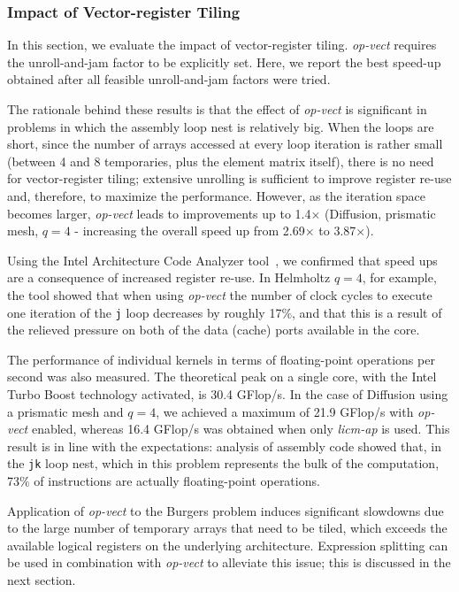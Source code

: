 \subsubsection{Impact of Vector-register Tiling}
\label{sec:perf-eval-opvect}

In this section, we evaluate the impact of vector-register tiling. \emph{op-vect} requires the unroll-and-jam factor to be explicitly set. Here, we report the best speed-up obtained after all feasible unroll-and-jam factors were tried. 

The rationale behind these results is that the effect of \emph{op-vect} is significant in problems in which the assembly loop nest is relatively big. When the loops are short, since the number of arrays accessed at every loop iteration is rather small (between 4 and 8 temporaries, plus the element matrix itself), there is no need for
vector-register tiling; extensive unrolling is sufficient to improve register re-use and, therefore, to maximize the performance. However, as the iteration space becomes larger, \emph{op-vect} leads to improvements up to 1.4$\times$ (Diffusion, prismatic mesh, $q=4$ - increasing the overall speed up from 2.69$\times$ to 3.87$\times$).

Using the Intel Architecture Code Analyzer tool~\cite{IACA}, we confirmed that speed ups are a consequence of increased register re-use. In Helmholtz $q=4$, for example, the tool showed that when using \emph{op-vect} the number of clock cycles to execute one iteration of the \texttt{j} loop decreases by roughly 17$\%$, and that this is a result of the relieved pressure on both of the data (cache) ports available in the core.

The performance of individual kernels in terms of floating-point operations per second was also measured. The theoretical peak on a single core, with the Intel Turbo Boost technology activated, is 30.4 GFlop/s. In the case of Diffusion using a prismatic mesh and $q=4$, we achieved a maximum of 21.9 GFlop/s with \emph{op-vect} enabled, whereas 16.4 GFlop/s was obtained when only \emph{licm-ap} is used. This result is in line with the expectations: analysis of assembly code showed that, in the \texttt{jk} loop nest, which in this problem represents the bulk of the computation, 73$\%$ of instructions are actually floating-point operations.

Application of \emph{op-vect} to the Burgers problem induces significant slowdowns due to the large number of temporary arrays that need to be tiled, which exceeds the available logical registers on the underlying architecture. Expression splitting can be used in combination with \emph{op-vect} to alleviate this issue; this is discussed in the next section.

